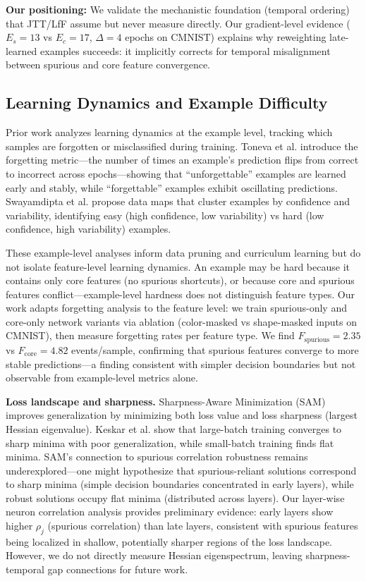 \textbf{Our positioning:} We validate the mechanistic foundation (temporal ordering) that JTT/LfF assume but never measure directly. Our gradient-level evidence ($E_s=13$ vs $E_c=17$, $\Delta=4$ epochs on CMNIST) explains why reweighting late-learned examples succeeds: it implicitly corrects for temporal misalignment between spurious and core feature convergence.

\subsection{Learning Dynamics and Example Difficulty}

Prior work analyzes learning dynamics at the example level, tracking which samples are forgotten or misclassified during training. Toneva et al. \cite{toneva2018empirical} introduce the forgetting metric---the number of times an example's prediction flips from correct to incorrect across epochs---showing that ``unforgettable'' examples are learned early and stably, while ``forgettable'' examples exhibit oscillating predictions. Swayamdipta et al. \cite{swayamdipta2020dataset} propose data maps that cluster examples by confidence and variability, identifying easy (high confidence, low variability) vs hard (low confidence, high variability) examples.

These example-level analyses inform data pruning and curriculum learning but do not isolate feature-level learning dynamics. An example may be hard because it contains only core features (no spurious shortcuts), or because core and spurious features conflict---example-level hardness does not distinguish feature types. Our work adapts forgetting analysis to the feature level: we train spurious-only and core-only network variants via ablation (color-masked vs shape-masked inputs on CMNIST), then measure forgetting rates per feature type. We find $F_{\text{spurious}} = 2.35$ vs $F_{\text{core}} = 4.82$ events/sample, confirming that spurious features converge to more stable predictions---a finding consistent with simpler decision boundaries but not observable from example-level metrics alone.

\textbf{Loss landscape and sharpness.} Sharpness-Aware Minimization (SAM) \cite{foret2020sharpnessaware} improves generalization by minimizing both loss value and loss sharpness (largest Hessian eigenvalue). Keskar et al. \cite{keskar2016large} show that large-batch training converges to sharp minima with poor generalization, while small-batch training finds flat minima. SAM's connection to spurious correlation robustness remains underexplored---one might hypothesize that spurious-reliant solutions correspond to sharp minima (simple decision boundaries concentrated in early layers), while robust solutions occupy flat minima (distributed across layers). Our layer-wise neuron correlation analysis provides preliminary evidence: early layers show higher $\rho_j$ (spurious correlation) than late layers, consistent with spurious features being localized in shallow, potentially sharper regions of the loss landscape. However, we do not directly measure Hessian eigenspectrum, leaving sharpness-temporal gap connections for future work.

